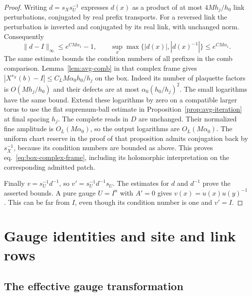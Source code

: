 \documentclass[11pt,letterpaper,reqno]{amsart}
\numberwithin{equation}{section}
\renewcommand{\eqref}[1]{\textup{eq.~\ref{#1}}}
\theoremstyle{definition}
\theoremstyle{remark}
\begin{document}
\begin{proof}
Writing $d=s_Xs_U^{-1}$ expresses $d(x)$ as a product of at most
$4Mh_j/h_0$ link perturbations, conjugated by real prefix transports.
For a reversed link the perturbation is inverted and conjugated by
its real link, with unchanged norm. Consequently
\[
 \|d-I\|_\infty\le e^{CM\alpha_1}-1,
 \qquad \sup_x\max\{|d(x)|,|d(x)^{-1}|\}\le e^{CM\alpha_1}.
\]
The same estimate bounds the condition numbers of all prefixes in
the comb comparison. Lemma~\ref{lem:avg-comb} in that complex frame
gives $|X^{s_X}(b)-I|\le C_LM\alpha_0 h_0/h_j$ on the box. Indeed
its number of plaquette factors is $O(Mh_j/h_0)$ and their defects
are at most $\alpha_0(h_0/h_j)^2$. The small logarithms have the same
bound. Extend these logarithms by zero on a compatible larger torus
to use the flat supremum-ball estimate in
Proposition~\ref{prop:avg-iteration} at final spacing $h_j$. The
complete reads in $D$ are unchanged. Their normalized fine amplitude
is $O_L(M\alpha_0)$, so the output logarithms are $O_L(M\alpha_0)$.
The uniform chart reserve in the proof of that proposition admits
conjugation back by $s_X^{-1}$, because its condition numbers are
bounded as above. This proves \eqref{eq:box-complex-frame}, including
its holomorphic interpretation on the corresponding admitted patch.

Finally $v=s_U^{-1}d^{-1}$, so $v'=s_U^{-1}d^{-1}s_U$. The estimates
for $d$ and $d^{-1}$ prove the asserted bounds. A pure gauge $U=I^u$
with $A'=0$ gives $v(x)=u(x)u(y)^{-1}$. This can be far from $I$,
even though its condition number is one and $v'=I$.
\end{proof}

\section{Gauge identities and site and link rows}\label{sec:gauge-rows}

\subsection{The effective gauge transformation}
\end{document}
